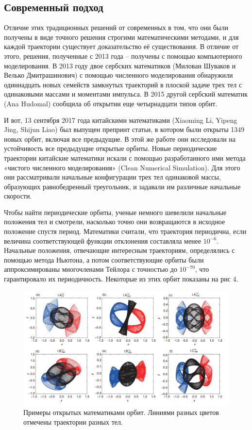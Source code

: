 \documentclass[a4paper, 12pt]{article}%
\begin{document}
\subsection{Современный подход}
Отличие этих традиционных решений от современных в том, что они были получены в виде точного решения строгими математическими методами, и для каждой траектории существует доказательство её существования. В отличие от этого, решения, полученные с 2013 года -- получены с помощью компьютерного моделирования. В 2013 году двое сербских математиков (Милован Шуваков и Велько Дмитрашинович) с помощью численного моделирования обнаружили одиннадцать новых семейств замкнутых траекторий в плоской задаче трех тел с одинаковыми массами и моментами импульса. В 2015 другой сербский математик (Ana Hudomal) сообщила об открытии еще четырнадцати типов орбит. 

И вот, 13 сентября 2017 года китайскими математиками (Xiaoming Li, Yipeng Jing, Shijun Liao) был выпущен препринт статьи, в котором были открыты 1349 новых орбит, включая все предыдущие. В этой же работе они исследовали на устойчивость все предыдущие открытые орбиты. Новые периодические траектории китайские математики искали с помощью разработанного ими метода «чистого численного моделирования» (Clean Numerical Simulation). Для этого они рассматривали начальные конфигурации трех тел одинаковой массы, образующих равнобедренный треугольник, и задавали им различные начальные скорости.

Чтобы найти периодические орбиты, ученые немного шевелили начальные положения тел и смотрели, насколько точно они возвращаются в исходное положение спустя период. Математики считали, что траектория периодична, если величина соответствующей функции отклонения составляла менее $10^{-6}$. Начальные положения, отвечающие интересным траекториям, определялись с помощью метода Ньютона, а потом соответствующие орбиты были аппроксимированы многочленами Тейлора с точностью до $10^{-70}$, что гарантировало их периодичность. Некоторые из этих орбит показаны на рис 4.

\begin{figure}[h!]
\includegraphics[scale=0.7]{f4.png}
\caption{Примеры открытых математиками орбит. Линиями разных цветов отмечены траектории разных тел.}
\end{figure}
\end{document}
